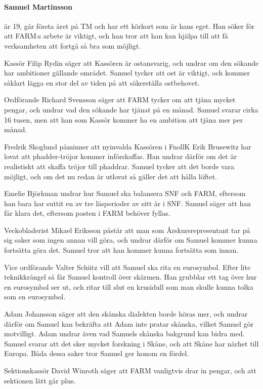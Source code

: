 \documentclass[hidelinks]{sektionsmote} %
\begin{document}
\paragraph{Samuel Martinsson} är 19, går första året på TM och har ett körkort som är hans eget.
Han söker för att FARM:s arbete är viktigt, och han tror att han kan hjälpa till att få verksamheten att fortgå så bra som möjligt.\par
Kassör Filip Rydin säger att Kassören är ostansvarig, och undrar om den sökande har ambitioner gällande området.
Samuel tycker att ost är viktigt, och kommer såklart lägga en stor del av tiden på att säkerställa ostbehovet.\par
Ordförande Richard Svensson säger att FARM tycker om att tjäna mycket pengar, och undrar vad den sökande har tjänat på en månad.
Samuel svarar cirka 16 tusen, men att han som Kassör kommer ha en ambition att tjäna mer per månad.\par
Fredrik Skoglund påminner att nyinvalda Kassören i FnollK Erik Brusewitz har lovat att phadder-tröjor kommer införskaffas.
Han undrar därför om det är realistiskt att skaffa tröjor till phaddrar.
Samuel tycker att det borde vara möjligt, och om det nu redan är utlovat så gäller det att hålla löftet.\par
Emelie Björkman undrar hur Samuel ska balansera SNF och FARM, eftersom han bara har suttit en av tre läsperioder av sitt år i SNF.
Samuel säger att han får klara det, eftersom posten i FARM behöver fyllas.\par
Veckobladerist Mikael Eriksson påstår att man som Årskursrepresentant tar på sig saker som ingen annan vill göra, och undrar därför om Samuel kommer kunna fortsätta göra det.
Samuel tror att han kommer kunna fortsätta som innan.\par
Vice ordförande Valter Schütz vill att Samuel ska rita en eurosymbol.
Efter lite teknikkrångel så får Samuel kontroll över skärmen.
Han grubblar ett tag över hur en eurosymbol ser ut, och ritar till slut en krusidull som man skulle kunna tolka som en eurosymbol.\par
Adam Johansson säger att den skånska dialekten borde höras mer, och undrar därför om Samuel kan bekräfta att Adam inte pratar skånska, vilket Samuel gör motvilligt.
Adam undrar även vad Samuels skånska bakgrund kan bidra med.
Samuel svarar att det sker mycket forskning i Skåne, och att Skåne har närhet till Europa.
Båda dessa saker tror Samuel ger honom en fördel.\par
Sektionskassör David Winroth säger att FARM vanligtvis drar in pengar, och att sektionen lätt går plus.
\end{document}
